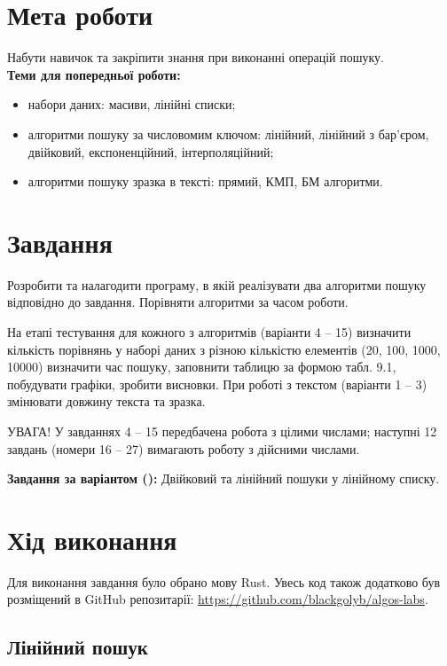 \section{Мета роботи}
Набути навичок та закріпити знання при виконанні операцій пошуку.
\\

\noindent
\textbf{Теми для попередньої роботи:}
\begin{itemize}
    \item набори даних: масиви, лінійні списки;
    \item алгоритми пошуку за числовомим ключом: лінійний, лінійний з бар’єром, двійковий, експоненційний, інтерполяційний;
    \item алгоритми пошуку зразка в тексті: прямий, КМП, БМ алгоритми.
\end{itemize}


\section{Завдання}
Розробити та налагодити програму, в якій реалізувати два алгоритми
пошуку відповідно до завдання. Порівняти алгоритми за часом роботи.

На етапі тестування для кожного з алгоритмів (варіанти 4 – 15)
визначити кількість порівнянь у наборі даних з різною кількістю елементів
(20, 100, 1000, 10000) визначити час пошуку, заповнити таблицю за формою
табл. 9.1, побудувати графіки, зробити висновки. При роботі з текстом
(варіанти 1 – 3) змінювати довжину текста та зразка.

УВАГА! У завданнях 4 – 15 передбачена робота з цілими числами;
наступні 12 завдань (номери 16 – 27) вимагають роботу з дійсними числами.

\noindent
\textbf{Завдання за варіантом (\variant): }Двійковий та лінійний пошуки у лінійному списку.


\section{Хід виконання}
Для виконання завдання було обрано мову Rust.
Увесь код також додатково був розміщений в GitHub репозитарії: \href{https://github.com/blackgolyb/algos-labs}{https://github.com/blackgolyb/algos-labs}.


\newpage
\subsection{Лінійний пошук}



